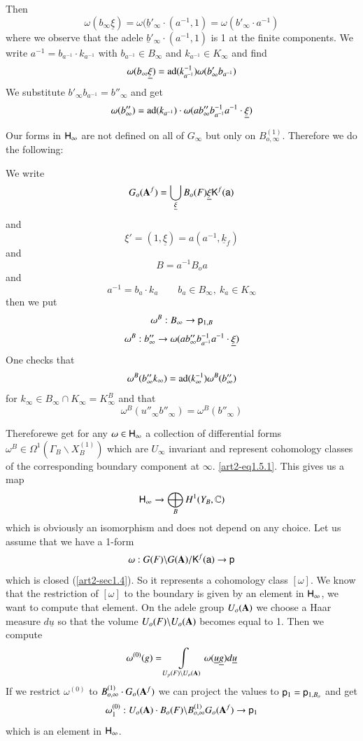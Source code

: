 Then
$$
\omega(b_{\infty}\underline{\xi})=\omega(\underline{b}'_{\infty}\cdot (a^{-1},1)=\omega(b'_{\infty}\cdot a^{-1})
$$
where we observe that the adele $\underline{b}'_{\infty}\cdot (a^{-1},1)$ is 1 at the finite components. We write $a^{-1}=b_{a^{-1}}\cdot k_{a^{-1}}$ with $b_{a^{-1}}\in B_{\infty}$ and $k_{a^{-1}}\in K_{\infty}$ and find
$$
\omega(b_{\infty}\underline{\xi})=\operatorname{ad}(k_{a^{-1}}^{-1})\omega(b'_{\infty}b_{a^{-1}})
$$
We substitute $b'_{\infty}b_{a^{-1}}=b''_{\infty}$ and get
$$
\omega(b''_{\infty})=\operatorname{ad}(k_{a^{-1}})\cdot \omega(ab''_{\infty}b^{-1}_{a^{-1}}a^{-1}\cdot \underline{\xi})
$$

Our forms in $\mathsf{H}_{\infty}$ are not defined on all of $G_{\infty}$ but only on $B_{o,\infty}^{(1)}$. Therefore we do the following:

We write
$$
G_{o}(\mathbf{A}^{f})=\bigcup\limits_{\underline{\xi}}B_{o}(F)\underline{\xi}\mathsf{K}^{f}(\mathsf{a})
$$
and
$$
\xi'=(1,\underline{\xi})=a(a^{-1},\underline{k}_{f})
$$
and
$$
B=a^{-1}B_{o}a
$$
and
$$
a^{-1}=b_{a}\cdot k_{a}\qquad b_{a}\in B_{\infty}, \ k_{a}\in K_{\infty}
$$
then we put
\begin{gather*}
\omega^{B}:B_{\infty}\to \mathsf{p}_{1,B}\\[3pt]
\omega^{B}:b''_{\infty}\to \omega(ab''_{\infty}b^{-1}_{a^{-1}}a^{-1}\cdot \underline{\xi})
\end{gather*}
One checks that
$$
\omega^{B}(b''_{\infty}k_{\infty})=\operatorname{ad}(k^{-1}_{\infty})\omega^{B}(b''_{\infty})
$$
for $k_{\infty}\in B_{\infty}\cap K_{\infty}=K^{B}_{\infty}$ and that
$$
\omega^{B}(u''_{\infty}b''_{\infty})=\omega^{B}(b''_{\infty})
$$

Therefore\pageoriginale we get for any $\omega\in \mathsf{H}_{\infty}$ a collection of differential forms $\omega^{B}\in \Omega^{1}(\Gamma_{B}\backslash X^{(1)}_{B})$ which are $U_{\infty}$ invariant and represent cohomology classes of the corresponding boundary component at $\infty$. \eqref{art2-eq1.5.1}. This gives us a map
$$
\mathsf{H}_{\infty}\to \bigoplus\limits_{B}H^{1}(Y_{B},\mathbb{C})
$$
which is obviously an isomorphism and does not depend on any choice. Let us assume that we have a 1-form
$$
\omega : G(F)\backslash G(\mathbf{A})/\mathsf{K}^{f}(\mathsf{a})\to \mathsf{p}
$$
which is closed (\ref{art2-sec1.4}). So it represents a cohomology class $[\omega]$. We know that the restriction of $[\omega]$ to the boundary is given by an element in $\mathsf{H}_{\infty}$, we want to compute that element. On the adele group $U_{o}(\mathbf{A})$ we choose a Haar measure $d\underline{u}$ so that the volume $U_{o}(F)\backslash U_{o}(\mathbf{A})$ becomes equal to 1. Then we compute
$$
\omega^{(0)}(g)=\int\limits_{U_{p}(F)\backslash U_{o}(\mathbf{A})}\omega(\underline{u}\underline{g})d\underline{u}
$$
If we restrict $\omega^{(0)}$ to $B_{o,\infty}^{(1)}\cdot G_{o}(\mathbf{A}^{f})$ we can project the values to $\mathsf{p}_{1}=\mathsf{p}_{1,B_{o}}$ and get
$$
\omega^{(0)}_{1}:U_{o}(\mathbf{A})\cdot B_{o}(F)\backslash B_{o,\infty}^{(1)}G_{o}(\mathbf{A}^{f})\to \mathsf{p}_{1}
$$
which is an element in $\mathsf{H}_{\infty}$.

